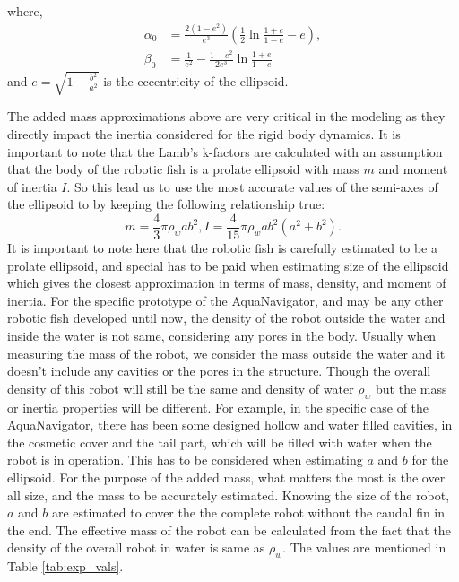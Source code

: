 \documentclass[pdflatex,sn-mathphys-num]{sn-jnl}
\theoremstyle{thmstyleone}%
\begin{document}
where,
\begin{equation*}
    \begin{aligned}
        \alpha_0 &= \frac{2(1-e^2)}{e^3} \left( \frac{1}{2} \ln \frac{1+e}{1-e} - e \right),\\
        \beta_0 &= \frac{1}{e^2} - \frac{1 - e^2}{2e^3} \ln \frac{1+e}{1-e}
    \end{aligned}
\end{equation*}
and $e = \sqrt{1 - \frac{b^2}{a^2}}$ is the eccentricity of the ellipsoid.
\par The added mass approximations above are very critical in the modeling as they directly impact the inertia considered for the rigid body dynamics. It is important to note that the Lamb's k-factors are calculated with an assumption that the body of the robotic fish is a prolate ellipsoid with mass $m$ and moment of inertia $I$. So this lead us to use the most accurate values of the semi-axes of the ellipsoid to by keeping the following relationship true:
\begin{equation}
    m = \frac{4}{3} \pi \rho_w ab^2,
    I = \frac{4}{15} \pi \rho_w ab^2 (a^2 + b^2).
\end{equation}
It is important to note here that the robotic fish is carefully estimated to be a prolate ellipsoid, and special has to be paid when estimating size of the ellipsoid which gives the closest approximation in terms of mass, density, and moment of inertia. For the specific prototype of the AquaNavigator, and may be any other robotic fish developed until now, the density of the robot outside the water and inside the water is not same, considering any pores in the body. Usually when measuring the mass of the robot, we consider the mass outside the water and it doesn't include any cavities or the pores in the structure. Though the overall density of this robot will still be the same and density of water $\rho_w$ but the mass or inertia properties will be different. For example, in the specific case of the AquaNavigator, there has been some designed hollow and water filled cavities, in the cosmetic cover and the tail part, which will be filled with water when the robot is in operation. This has to be considered when estimating $a$ and $b$ for the ellipsoid. For the purpose of the added mass, what matters the most is the over all size, and the mass to be accurately estimated. Knowing the size of the robot, $a$ and $b$ are estimated to cover the the complete robot without the caudal fin in the end. The effective mass of the robot can be calculated from the fact that the density of the overall robot in water is same as $\rho_w$. The values are mentioned in Table \ref{tab:exp_vals}.
\end{document}
